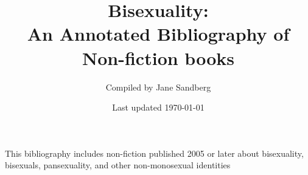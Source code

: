 \documentclass[12pt]{article}
\title{Bisexuality: \\An Annotated Bibliography of Non-fiction books}
\author{Compiled by Jane Sandberg}
\date{Last updated \today}
\begin{document}
\maketitle

 
 This bibliography includes non-fiction published 2005 or later about bisexuality, bisexuals, pansexuality, and other non-monosexual identities
 
 \newpage

 
 \nocite{*}
 
 \printbibliography[title={Draft},heading=bibnumbered]
 
\end{document}
